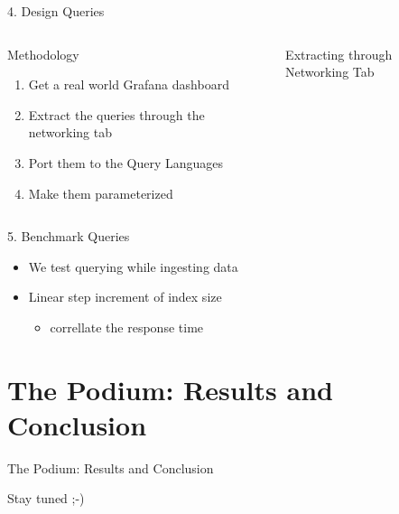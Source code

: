 \documentclass[compress,aspectratio=169]{beamer}
\begin{document}
\begin{frame}{4. Design Queries}
\begin{columns}[T]
\begin{column}{0.5\textwidth}
\begin{block}{Methodology}
\begin{enumerate}
  \item Get a real world Grafana dashboard
  \item Extract the queries through the networking tab
  \item Port them to the Query Languages
  \item Make them parameterized
\end{enumerate}
\end{block}
\end{column}
\begin{column}{0.5\textwidth}
\begin{figure}
  \centering
  \caption{Extracting through Networking Tab}
\end{figure}
\end{column}
\end{columns}
\end{frame}

\begin{frame}{5. Benchmark Queries}
\begin{itemize}
  \item We test querying while ingesting data
  \item Linear step increment of index size
  \begin{itemize}
    \item correllate the response time
  \end{itemize}
\end{itemize}
\end{frame}

\section[Results]{The Podium: Results and Conclusion}

\begin{frame}{The Podium: Results and Conclusion}
  \begin{center}
    \LARGE Stay tuned ;-)
  \end{center}
\label{pg:lastpage} %
\end{frame}

\end{document}
